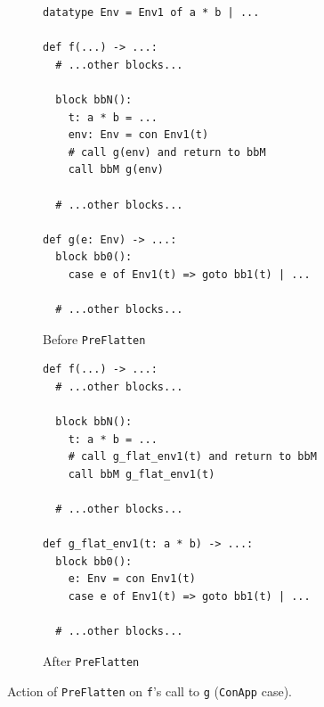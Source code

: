 \begin{figure}[htbp]
  \centering
  \begin{subfigure}[t]{0.48\textwidth}
    \caption{Before \texttt{PreFlatten}}
    \label{fig:pre_flatten_con_before}
    \vspace{1mm}
\begin{verbatim}
datatype Env = Env1 of a * b | ...

def f(...) -> ...:
  # ...other blocks...

  block bbN():
    t: a * b = ...
    env: Env = con Env1(t)
    # call g(env) and return to bbM
    call bbM g(env)

  # ...other blocks...

def g(e: Env) -> ...:
  block bb0():
    case e of Env1(t) => goto bb1(t) | ...

  # ...other blocks...
\end{verbatim}
  \end{subfigure}\hfill
  \begin{subfigure}[t]{0.48\textwidth}
    \caption{After \texttt{PreFlatten}}
    \label{fig:pre_flatten_con_after}
    \vspace{1mm}
\begin{verbatim}
def f(...) -> ...:
  # ...other blocks...

  block bbN():
    t: a * b = ...
    # call g_flat_env1(t) and return to bbM
    call bbM g_flat_env1(t)

  # ...other blocks...

def g_flat_env1(t: a * b) -> ...:
  block bb0():
    e: Env = con Env1(t)
    case e of Env1(t) => goto bb1(t) | ...

  # ...other blocks...
\end{verbatim}
  \end{subfigure}
  \caption{Action of \texttt{PreFlatten} on \texttt{f}'s call to \texttt{g} (\texttt{ConApp} case).}
  \label{fig:pre_flatten_example_con}
\end{figure}


